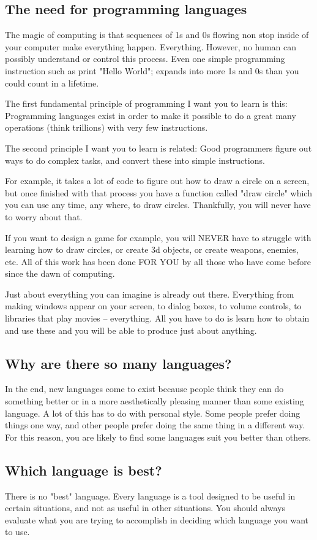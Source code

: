 \documentclass[a4paper,12pt]{article}
\begin{document}
\subsection{The need for programming languages}
The magic of computing is that sequences of 1s and 0s flowing non stop inside of your computer make everything happen. Everything. However, no human can possibly understand or control this process. Even one simple programming instruction such as print "Hello World"; expands into more 1s and 0s than you could count in a lifetime.

The first fundamental principle of programming I want you to learn is this: Programming languages exist in order to make it possible to do a great many operations (think trillions) with very few instructions.

The second principle I want you to learn is related: Good programmers figure out ways to do complex tasks, and convert these into simple instructions.

For example, it takes a lot of code to figure out how to draw a circle on a screen, but once finished with that process you have a function called "draw circle" which you can use any time, any where, to draw circles. Thankfully, you will never have to worry about that.

If you want to design a game for example, you will NEVER have to struggle with learning how to draw circles, or create 3d objects, or create weapons, enemies, etc. All of this work has been done FOR YOU by all those who have come before since the dawn of computing.

Just about everything you can imagine is already out there. Everything from making windows appear on your screen, to dialog boxes, to volume controls, to libraries that play movies -- everything. All you have to do is learn how to obtain and use these and you will be able to produce just about anything.
\subsection{Why are there so many languages?}
In the end, new languages come to exist because people think they can do something better or in a more aesthetically pleasing manner than some existing language. A lot of this has to do with personal style. Some people prefer doing things one way, and other people prefer doing the same thing in a different way. For this reason, you are likely to find some languages suit you better than others.
\subsection{Which language is best?}
There is no "best" language. Every language is a tool designed to be useful in certain situations, and not as useful in other situations. You should always evaluate what you are trying to accomplish in deciding which language you want to use.
\end{document}
